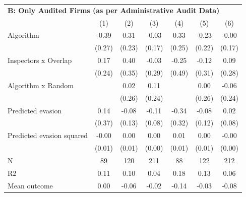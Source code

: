 \begin{tabular}{lccc|ccc}
\midrule \multicolumn{7}{l}{\textbf{B: Only Audited Firms (as per Administrative Audit Data)}} \\ \multicolumn{1}{l}{} & (1) & (2) & (3) & (4) & (5) & (6) \\ \midrule

Algorithm   &       -0.39         &        0.31         &       -0.03         &        0.33         &       -0.23         &       -0.00         \\
            &      (0.27)         &      (0.23)         &      (0.17)         &      (0.25)         &      (0.22)         &      (0.17)         \\
\addlinespace
Inspectors x Overlap&        0.17         &        0.40         &       -0.03         &       -0.25         &       -0.12         &        0.09         \\
            &      (0.24)         &      (0.35)         &      (0.29)         &      (0.49)         &      (0.31)         &      (0.28)         \\
\addlinespace
Algorithm x Random&                     &        0.02         &        0.11         &                     &        0.00         &       -0.06         \\
            &                     &      (0.26)         &      (0.24)         &                     &      (0.26)         &      (0.24)         \\
\addlinespace
Predicted evasion&        0.14         &       -0.08         &       -0.11         &       -0.34         &       -0.08         &        0.02         \\
            &      (0.37)         &      (0.13)         &      (0.08)         &      (0.32)         &      (0.12)         &      (0.08)         \\
\addlinespace
Predicted evasion squared&       -0.00         &        0.00         &        0.00         &        0.01         &        0.00         &       -0.00         \\
            &      (0.01)         &      (0.01)         &      (0.00)         &      (0.01)         &      (0.01)         &      (0.00)         \\
\midrule
N           &          89         &         120         &         211         &          88         &         122         &         212         \\
R2          &        0.11         &        0.10         &        0.04         &        0.18         &        0.13         &        0.06         \\
Mean outcome&        0.00         &       -0.06         &       -0.02         &       -0.14         &       -0.03         &       -0.08         \\
\bottomrule \end{tabular}

